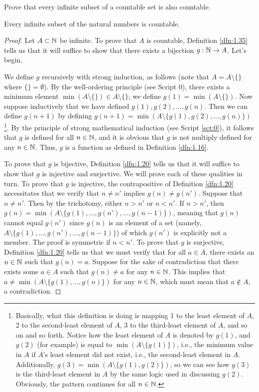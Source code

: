 \documentclass[../main.tex]{subfiles}
\begin{document}
\begin{exercise}\label{exr:1.37}
    Prove that every infinite subset of a countable set is also countable.
    \begin{lemma*}
        Every infinite subset of the natural numbers is countable.
        \begin{proof}
            Let $A\subset\mathbb{N}$ be infinite. To prove that $A$ is countable, Definition \ref{dfn:1.35} tells us that it will suffice to show that there exists a bijection $g:\mathbb{N}\to A$. Let's begin.\par
            We define $g$ recursively with strong induction, as follows (note that $A=A\setminus\{\}$ where $\{\}=\emptyset$). By the well-ordering principle (see Script 0), there exists a minimum element $\min(A\setminus\{\})\in A\setminus\{\}$; we define $g(1)=\min(A\setminus\{\})$. Now suppose inductively that we have defined $g(1),g(2),\dots,g(n)$. Then we can define $g(n+1)$ by defining $g(n+1)=\min(A\setminus\{g(1),g(2),\dots,g(n)\})$\footnote{Basically, what this definition is doing is mapping 1 to the least element of $A$, 2 to the second-least element of $A$, 3 to the third-least element of $A$, and so on and so forth. Notice how the least element of $A$ is denoted by $g(1)$, and $g(2)$ (for example) is equal to $\min(A\setminus\{g(1)\})$, i.e., the minimum value in $A$ if $A$'s least element did not exist, i.e., the second-least element in $A$. Additionally, $g(3)=\min(A\setminus\{g(1),g(2)\})$, so we can see how $g(3)$ is the third-least element in $A$ by the same logic used in discussing $g(2)$. Obviously, the pattern continues for all $n\in\mathbb{N}$.}. By the principle of strong mathematical induction (see Script \ref{sct:0}), it follows that $g$ is defined for all $n\in\mathbb{N}$, and it is obvious that $g$ is not multiply defined for any $n\in\mathbb{N}$. Thus, $g$ is a function as defined in Definition \ref{dfn:1.16}.\par
            To prove that $g$ is bijective, Definition \ref{dfn:1.20} tells us that it will suffice to show that $g$ is injective and surjective. We will prove each of these qualities in turn. To prove that $g$ is injective, the contrapositive of Definition \ref{dfn:1.20} necessitates that we verify that $n\neq n'$ implies $g(n)\neq g(n')$. Suppose that $n\neq n'$. Then by the trichotomy, either $n>n'$ or $n<n'$. If $n>n'$, then $g(n)=\min(A\setminus\{g(1),\dots,g(n'),\dots,g(n-1)\})$, meaning that $g(n)$ cannot equal $g(n')$ since $g(n)$ is an element of a set (namely, $A\setminus\{g(1),\dots,g(n'),\dots,g(n-1)\}$) of which $g(n')$ is explicitly not a member. The proof is symmetric if $n<n'$. To prove that $g$ is surjective, Definition \ref{dfn:1.20} tells us that we must verify that for all $a\in A$, there exists an $n\in\mathbb{N}$ such that $g(n)=a$. Suppose for the sake of contradiction that there exists some $a\in A$ such that $g(n)\neq a$ for any $n\in\mathbb{N}$. This implies that $a\neq\min(A\setminus\{g(1),\dots,g(n)\})$ for any $n\in\mathbb{N}$, which must mean that $a\notin A$, a contradiction.

\end{proof}
\end{lemma*}
\end{exercise}
\end{document}
